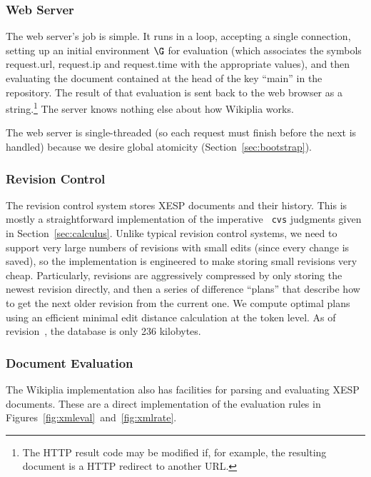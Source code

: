 \documentclass[twocolumn]{article}
\begin{document}
\subsubsection{Web Server}

The web server's job is simple. It runs in a loop, accepting a single
connection, setting up an initial environment $\G$ for evaluation
(which associates the symbols {\sf request.url}, {\sf request.ip} and
{\sf request.time} with the appropriate values), and then evaluating
the document contained at the head of the key ``main'' in the
repository. The result of that evaluation is sent back to the web
browser as a string.\z\footnote{The HTTP result code may be modified
if, for example, the resulting document is a HTTP redirect to another
URL.} The server knows nothing else about how Wikiplia works.

The web server is single-threaded (so each request must finish
before the next is handled) because we desire global atomicity
(Section~\ref{sec:bootstrap}).

\subsubsection{Revision Control}

The revision control system stores XESP documents and their history.
This is mostly a straightforward implementation of the imperative {\tt
cvs} judgments given in Section~\ref{sec:calculus}. Unlike typical
revision control systems, we need to support very large numbers of
revisions with small edits (since every change is saved), so the
implementation is engineered to make storing small revisions very
cheap. Particularly, revisions are aggressively compressed by only
storing the newest revision directly, and then a series of difference
``plans'' that describe how to get the next older revision from the
current one. We compute optimal plans using an efficient minimal edit
distance calculation at the
token level. As of revision~\currentrevision,
the database is only 236 kilobytes.\z{}

\subsubsection{Document Evaluation}

The Wikiplia implementation also has facilities for parsing and
evaluating XESP documents. These are a direct implementation of the
evaluation rules in Figures~\ref{fig:xmleval}~and~\ref{fig:xmlrate}.
\end{document}

